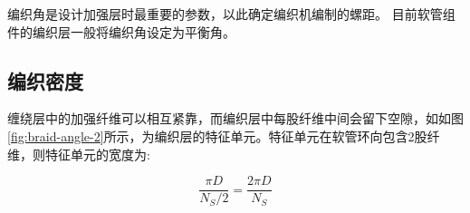 \begin{figure}[!htb]
{\label{fig:braid-angle-2}}
\label{fig:braid angle and represtive cell}
\end{figure}


编织角是设计加强层时最重要的参数，以此确定编织机编制的螺距。
目前软管组件的编织层一般将编织角设定为平衡角。





\subsection{编织密度}

缠绕层中的加强纤维可以相互紧靠，而编织层中每股纤维中间会留下空隙，如如图\ref{fig:braid-angle-2}所示，为编织层的特征单元。特征单元在软管环向包含2股纤维，则特征单元的宽度为:

\begin{equation}
\frac{{\pi D}}{{{N_S}/2}} = \frac{{2\pi D}}{{{N_S}}}
\end{equation}

